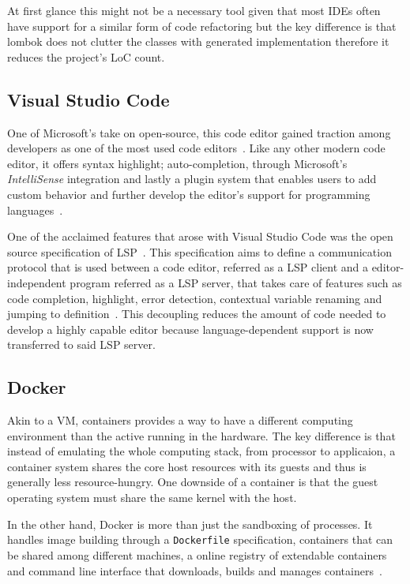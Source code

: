 At first glance this might not be a necessary tool given that most \gls{IDE}s often have support for a similar form of code refactoring but the key difference is that lombok does not clutter the classes with generated implementation therefore it reduces the project's \gls{LoC} count.

\subsection{Visual Studio Code}
One of Microsoft's take on open-source, this code editor gained traction among developers as one of the most used code editors~\cite{vscodesurvey}. Like any other modern code editor, it offers syntax highlight; auto-completion, through Microsoft's \textit{IntelliSense} integration and lastly a plugin system that enables users to add custom behavior and further develop the editor's support for programming languages~\cite{vscode}.

One of the acclaimed features that arose with Visual Studio Code was the open source specification of \gls{LSP}~\cite{lsplaunch}. This specification aims to define a communication protocol that is used between a code editor, referred as a \gls{LSP} client and a editor-independent program referred as a \gls{LSP} server, that takes care of features such as code completion, highlight, error detection, contextual variable renaming and jumping to definition~\cite{lspspec}. This decoupling reduces the amount of code needed to develop a highly capable editor because language-dependent support is now transferred to said \gls{LSP} server.

\subsection{Docker}
Akin to a \gls{VM}, containers provides a way to have a different computing environment than the active running in the hardware. The key difference is that instead of emulating the whole computing stack, from processor to applicaion, a container system shares the core host resources with its guests and thus is generally less resource-hungry. One downside of a container is that the guest operating system must share the same kernel with the host.

In the other hand, Docker is more than just the sandboxing of processes. It handles image building through a \texttt{Dockerfile} specification, containers that can be shared among different machines, a online registry of extendable containers and command line interface that downloads, builds and manages containers~\cite{dockerfag}.

